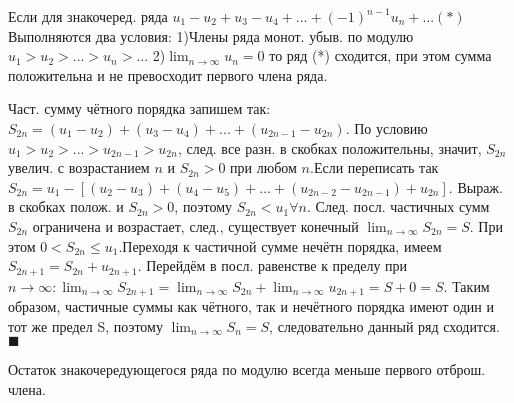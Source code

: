 \documentclass[unicode,10pt, landscape]{article}
\newenvironment{Proof} %
{\par\noindent{\bf Док-во:}} %
{\hfill$\scriptstyle\blacksquare$}
\begin{document}
\begin{multicols}{2}
\begin{Th}
Если для знакочеред.  ряда
$u_{1}-u_2+u_3-u_4+...+(-1)^{n-1}u_n+...(*)$
Выполняются два условия:
1)Члены ряда монот. убыв. по модулю $u_{1} > u_2 > ...> u_n > ...$
2)$\lim_{n \to \infty} u_n = 0$
то ряд (*) сходится, при этом сумма положительна и не превосходит первого члена ряда.
\begin{Proof}
Част. сумму чётного порядка запишем так: $S_{2n}=(u_{1}-u_2)+(u_3-u_4)+...+(u_{2n-1}-u_{2n})$.
По условию $u_{1} > u_2 > ...> u_{2n-1} > u_{2n}$, след. все разн. в скобках положительны, значит, $S_{2n}$ увелич. с возрастанием $n$  и $ S_{2n}>0$ при любом $n$.Если переписать так $S_{2n}=u_{1}-[(u_2-u_3)+(u_4-u_5)+...+(u_{2n-2}-u_{2n-1})+u_{2n}]$. Выраж. в скобках полож. и  $S_{2n}>0$, поэтому  $S_{2n}<u_1 \forall n$. След. посл. частичных сумм $S_{2n}$ ограничена и возрастает, след., существует конечный  $\lim_{n \to \infty}S_{2n}=S$. При этом $ 0<S_{2n}\leq u_1$.Переходя к частичной сумме нечётн порядка, имеем $S_{2n+1}=S_{2n}+u_{2n+1}$. Перейдём в посл. равенстве к пределу при $n \to \infty:\lim_{n \to \infty}S_{2n+1}=\lim_{n \to \infty}S_{2n}+\lim_{n \to \infty}u_{2n+1}=S+0=S$. Таким образом, частичные суммы как чётного, так и нечётного порядка имеют один и тот же предел S, поэтому $\lim_{n \to \infty}S_{n}=S$, следовательно данный ряд сходится.
\end{Proof}
\end{Th}
Остаток знакочередующегося ряда по модулю всегда меньше первого отброш. члена.



\end{multicols}
\end{document}
